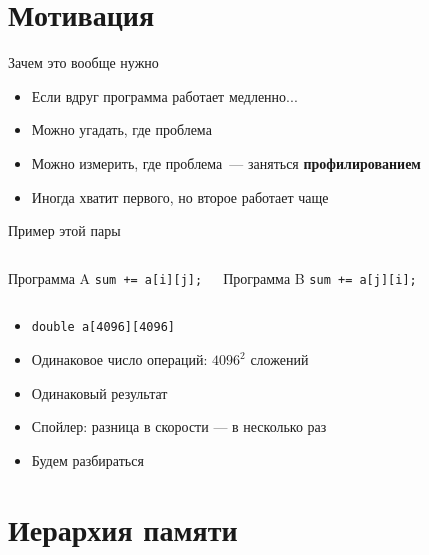 \documentclass{../../slides-style}
\begin{document}
\begin{frame}
    \titlepage
\end{frame}

\section{Мотивация}

\begin{frame}{Зачем это вообще нужно}
    \begin{itemize}
        \item Если вдруг программа работает медленно...
        \item Можно угадать, где проблема
        \item Можно измерить, где проблема~--- заняться \textbf{профилированием}
        \item Иногда хватит первого, но второе работает чаще
    \end{itemize}
\end{frame}

\begin{frame}{Пример этой пары}
    \begin{columns}
        \begin{block}{Программа A}
            \texttt{sum += a[\alert{i}][\alert{j}];}
        \end{block}
        \begin{block}{Программа B}
            \texttt{sum += a[\alert{j}][\alert{i}];}
        \end{block}
    \end{columns}

    \bigskip
    \begin{itemize}
        \item \texttt{double a[4096][4096]}
        \item Одинаковое число операций: $4096^2$ сложений
        \item Одинаковый результат
        \item Спойлер: разница в скорости --- в несколько раз
        \item Будем разбираться
    \end{itemize}
\end{frame}

\section{Иерархия памяти}
\end{document}
